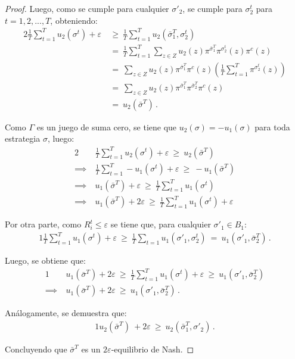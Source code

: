 \begin{proof}
Luego, como se cumple para cualquier $\sigma'_2$, se cumple para $\sigma_2^t$ para $t = 1, 2, ..., T$, obteniendo:
\begin{alignat}{2}
\frac{1}{T} \sum_{t = 1}^T u_2(\sigma^t) + \varepsilon\ & \geq\ \frac{1}{T} \sum_{t = 1}^T u_2(\bar{\sigma}_1^T, \sigma_2^t) \\
&=\ \frac{1}{T} \sum_{t = 1}^T \sum_{z \in Z} u_2(z) \pi^{\bar{\sigma}_1^T}\pi^{\sigma_2^t}(z) \pi^c(z) \\
&=\  \sum_{z \in Z} u_2(z) \pi^{\bar{\sigma}_1^T} \pi^c(z) \left( \frac{1}{T} \sum_{t = 1}^T \pi^{\sigma_2^t}(z) \right)\\
&=\  \sum_{z \in Z} u_2(z) \pi^{\bar{\sigma}_1^T} \pi^{\bar{\sigma}_2^T} \pi^c(z) \\
&=\ u_2(\bar{\sigma}^T) \,.
\end{alignat}

Como $\Gamma$ es un juego de suma cero, se tiene que $u_2(
\sigma) = -u_1(\sigma)$ para toda estrategia $\sigma$, luego:
\begin{alignat}{2}
	& \frac{1}{T} \sum_{t = 1}^T u_2(\sigma^t) + \varepsilon\ \geq\  u_2(\bar{\sigma}^T) \\
	\implies\ & \frac{1}{T} \sum_{t = 1}^T -u_1(\sigma^t) + \varepsilon\ \geq\  -u_1(\bar{\sigma}^T) \\
	\implies\ &  u_1(\bar{\sigma}^T) + \varepsilon\ \geq\   \frac{1}{T} \sum_{t = 1}^T u_1(\sigma^t)  \\
	\implies\ &  u_1(\bar{\sigma}^T) + 2\varepsilon\ \geq\   \frac{1}{T} \sum_{t = 1}^T u_1(\sigma^t) + \varepsilon
\end{alignat}

Por otra parte, como $R_i^t \leq \varepsilon$ se tiene que, para cualquier $\sigma'_1 \in B_1$:
\begin{alignat}{1}
	\frac{1}{T} \sum_{t = 1}^T u_1(\sigma^t) + \varepsilon\ \geq\ \frac{1}{T} \sum_{t = 1} u_1(\sigma'_1, \sigma_2^t)\ =\ u_1(\sigma'_1, \bar{\sigma}_2^T) \,.
\end{alignat}

Luego, se obtiene que:
\begin{alignat}{1}
	& u_1(\bar{\sigma}^T) + 2\varepsilon\ \geq\   \frac{1}{T} \sum_{t = 1}^T u_1(\sigma^t) + \varepsilon\ \geq\ u_1(\sigma'_1, \bar{\sigma}_2^T)\\
	\implies\ & u_1(\bar{\sigma}^T) + 2\varepsilon\ \geq\ u_1(\sigma'_1, \bar{\sigma}_2^T) \,.
\end{alignat}

Análogamente, se demuestra que:
\begin{alignat}{1}
	u_2(\bar{\sigma}^T)\ + 2\varepsilon\ \geq\ u_2( \bar{\sigma}_1^T, \sigma'_2) \,.
\end{alignat}

Concluyendo que $\bar{\sigma}^T$ es un $2\varepsilon$-equilibrio de Nash.
\end{proof}

